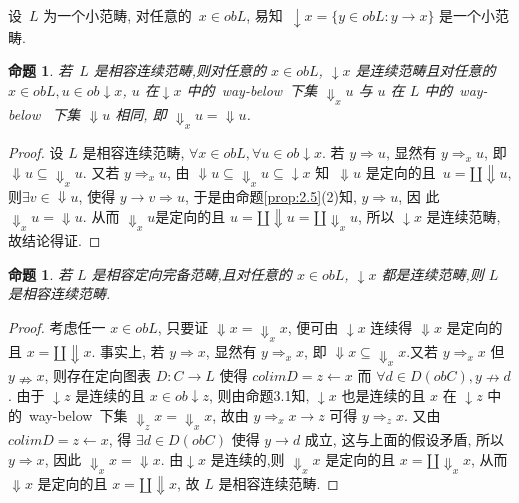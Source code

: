 \documentclass[c5size,a4paper,hyperref,fancyhdr,UTF8,fontset=fandol]{ctexart}
\theoremstyle{nonumberplain}
\newtheorem{proof}{证明}
\newtheorem{proposition}[definition]{命题}
\theoremstyle{nonumberplain}
\newtheorem{proof}{证}
\begin{document}
设~$L$ 为一个小范畴, 对任意的~$x\in obL$, 易知~$\downarrow x=\{y\in obL:y\rightarrow x\}$ 是一个小范畴.

\begin{proposition}\label{prop:3.1}
  若~$L$ 是相容连续范畴,则对任意的 $x\in obL$, $\downarrow x$ 是连续范畴且对任意的 $x\in obL, u\in ob\downarrow x$, $u$ 在$\downarrow x$ 中的~way-below~下集 $\Downarrow_{x}u$ 与 $u$ 在 $L$ 中的~way-below~ 下集 $\Downarrow u$ 相同, 即 $\Downarrow_{x}u=\Downarrow u$.
\end{proposition}

\begin{proof}\label{prop:3.2}
  设 $L$ 是相容连续范畴, $\forall x\in obL, \forall u\in ob\downarrow x$. 若 $y\Rightarrow u$, 显然有   $y\Rightarrow_{x} u$, 即 $\Downarrow u\subseteq\Downarrow_{x}u$. 又若 $y\Rightarrow_{x}u$, 由 $\Downarrow u\subseteq\Downarrow_{x}u\subseteq\downarrow x$ 知~$\Downarrow u$ 是定向的且~$u=\amalg\Downarrow u$, 则$\exists v\in\Downarrow u$, 使得 $y\rightarrow v\Rightarrow u$, 于是由命题\ref{prop:2.5}(2)知, $y\Rightarrow u$, 因 此 $\Downarrow_{x}u=\Downarrow u$. 从而 $\Downarrow_{x}u$是定向的且 $u=\amalg\Downarrow u=\amalg\Downarrow_{x}u$, 所以 $\downarrow x$ 是连续范畴,故结论得证.
\end{proof}

\begin{proposition}
  若 $L$ 是相容定向完备范畴,且对任意的 $x\in obL$, $\downarrow x$ 都是连续范畴,则 $L$ 是相容连续范畴.
\end{proposition}

\begin{proof}
    考虑任一 $x\in obL$, 只要证 $\Downarrow x=\Downarrow_{x}x$, 便可由 $\downarrow x$ 连续得
    $\Downarrow x$ 是定向的且 $x=\amalg\Downarrow x$. 事实上, 若 $y\Rightarrow x$, 显然有 $y\Rightarrow_{x}x$,
    即 $\Downarrow x\subseteq\Downarrow_{x}x$.又若 $y\Rightarrow_{x}x$ 但 $y\nRightarrow x$,
    则存在定向图表 $D:C\rightarrow L$ 使得 $colim D=z\leftarrow x$ 而 $\forall d\in D(obC), y\nrightarrow d$.
    由于 $\downarrow z$ 是连续的且 $x\in ob\downarrow z$, 则由命题3.1知, $\downarrow x$ 也是连续的且 $x$ 在 $\downarrow z$
    中的~way-below~下集 $\Downarrow_{z}x=\Downarrow_{x}x$, 故由 $y\Rightarrow_{x}x\rightarrow z$ 可得 $y\Rightarrow_{z}x$.
    又由 $colim D=z\leftarrow x$, 得 $\exists d\in D(obC)$ 使得 $y\rightarrow d$ 成立, 这与上面的假设矛盾, 所以 $y\Rightarrow x$,
    因此 $\Downarrow_{x}x=\Downarrow x$. 由$\downarrow x$ 是连续的,则 $\Downarrow_{x}x$ 是定向的且 $x=\amalg\Downarrow_{x}x$,
    从而 $\Downarrow x$ 是定向的且 $x=\amalg\Downarrow x$, 故 $L$ 是相容连续范畴.
\end{proof}
\end{document}
